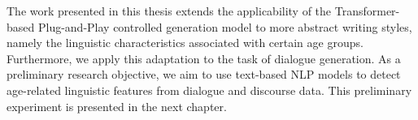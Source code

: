 The work presented in this thesis extends the applicability of the Transformer-based Plug-and-Play controlled generation model to more abstract writing styles, namely the linguistic characteristics associated with certain age groups. Furthermore, we apply this adaptation to the task of dialogue generation. As a preliminary research objective, we aim to use text-based NLP models to detect age-related linguistic features from dialogue and discourse data. This preliminary experiment is presented in the next chapter.

